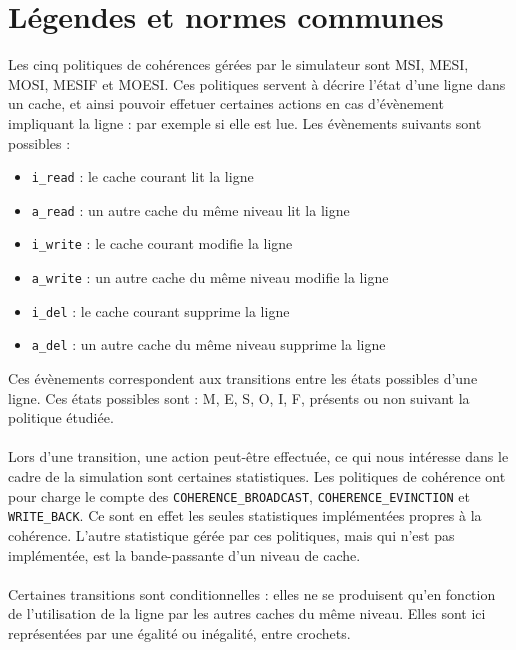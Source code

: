 \section{Légendes et normes communes}

Les cinq politiques de cohérences gérées par le simulateur sont MSI, MESI, MOSI, MESIF et MOESI. Ces politiques servent à décrire l'état d'une ligne dans un cache, et ainsi pouvoir effetuer certaines actions en cas d'évènement impliquant la ligne : par exemple si elle est lue. Les évènements suivants sont possibles :
\begin{itemize}
\item{\verb!i_read! : le cache courant lit la ligne}
\item{\verb!a_read! : un autre cache du même niveau lit la ligne}
\item{\verb!i_write! : le cache courant modifie la ligne}
\item{\verb!a_write! : un autre cache du même niveau modifie la ligne}
\item{\verb!i_del! : le cache courant supprime la ligne}
\item{\verb!a_del! : un autre cache du même niveau supprime la ligne}\\
\end{itemize}
Ces évènements correspondent aux transitions entre les états possibles d'une ligne. Ces états possibles sont : M, E, S, O, I, F, présents ou non suivant la politique étudiée.

\paragraph{}
Lors d'une transition, une action peut-être effectuée, ce qui nous intéresse dans le cadre de la simulation sont certaines statistiques. Les politiques de cohérence ont pour charge le compte des \verb!COHERENCE_BROADCAST!, \verb!COHERENCE_EVINCTION! et \verb!WRITE_BACK!. Ce sont en effet les seules statistiques implémentées propres à la cohérence. L'autre statistique gérée par ces politiques, mais qui n'est pas implémentée, est la bande-passante d'un niveau de cache. 

\paragraph{}
Certaines transitions sont conditionnelles : elles ne se produisent qu'en fonction de l'utilisation de la ligne par les autres caches du même niveau. Elles sont ici représentées par une égalité ou inégalité, entre crochets.

